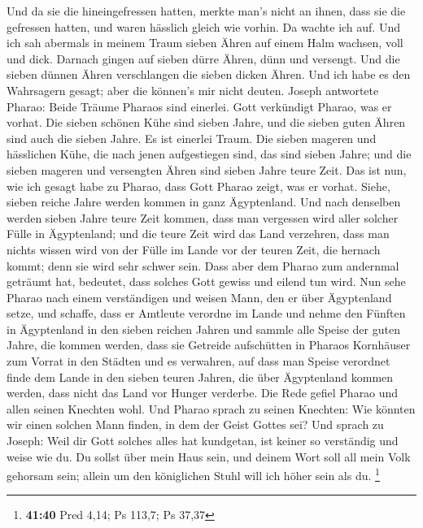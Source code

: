 Und da sie die hineingefressen hatten, merkte man's nicht an ihnen, dass
sie die gefressen hatten, und waren hässlich gleich wie vorhin. Da
wachte ich auf.  Und ich sah abermals in meinem Traum
sieben Ähren auf einem Halm wachsen, voll und dick. 
Darnach gingen auf sieben dürre Ähren, dünn und versengt. 
Und die sieben dünnen Ähren verschlangen die sieben dicken Ähren. Und
ich habe es den Wahrsagern gesagt; aber die können's mir nicht deuten.
 Joseph antwortete Pharao: Beide Träume Pharaos sind
einerlei. Gott verkündigt Pharao, was er vorhat.  Die
sieben schönen Kühe sind sieben Jahre, und die sieben guten Ähren sind
auch die sieben Jahre. Es ist einerlei Traum.  Die sieben
mageren und hässlichen Kühe, die nach jenen aufgestiegen sind, das sind
sieben Jahre; und die sieben mageren und versengten Ähren sind sieben
Jahre teure Zeit.  Das ist nun, wie ich gesagt habe zu
Pharao, dass Gott Pharao zeigt, was er vorhat.  Siehe,
sieben reiche Jahre werden kommen in ganz Ägyptenland.  Und
nach denselben werden sieben Jahre teure Zeit kommen, dass man vergessen
wird aller solcher Fülle in Ägyptenland; und die teure Zeit wird das
Land verzehren,  dass man nichts wissen wird von der Fülle
im Lande vor der teuren Zeit, die hernach kommt; denn sie wird sehr
schwer sein.  Dass aber dem Pharao zum andernmal geträumt
hat, bedeutet, dass solches Gott gewiss und eilend tun wird.
 Nun sehe Pharao nach einem verständigen und weisen Mann,
den er über Ägyptenland setze,  und schaffe, dass er
Amtleute verordne im Lande und nehme den Fünften in Ägyptenland in den
sieben reichen Jahren  und sammle alle Speise der guten
Jahre, die kommen werden, dass sie Getreide aufschütten in Pharaos
Kornhäuser zum Vorrat in den Städten und es verwahren,  auf
dass man Speise verordnet finde dem Lande in den sieben teuren Jahren,
die über Ägyptenland kommen werden, dass nicht das Land vor Hunger
verderbe.  Die Rede gefiel Pharao und allen seinen Knechten
wohl.  Und Pharao sprach zu seinen Knechten: Wie könnten
wir einen solchen Mann finden, in dem der Geist Gottes sei?
 Und sprach zu Joseph: Weil dir Gott solches alles hat
kundgetan, ist keiner so verständig und weise wie du.  Du
sollst über mein Haus sein, und deinem Wort soll all mein Volk gehorsam
sein; allein um den königlichen Stuhl will ich höher sein als du.
\footnote{\textbf{41:40} Pred 4,14; Ps 113,7; Ps 37,37} 
